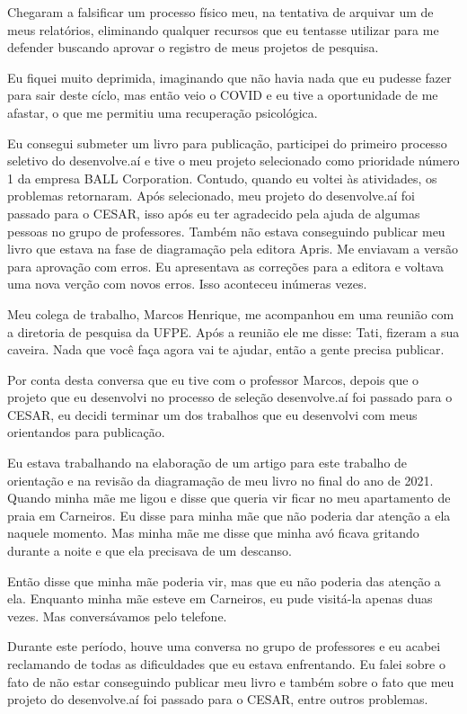 \documentclass[11pt]{book}
\begin{document}
Chegaram a falsificar um processo físico meu, na tentativa de arquivar um de meus relatórios, eliminando qualquer recursos que eu tentasse utilizar para me defender buscando aprovar o registro de meus projetos de pesquisa.

Eu fiquei muito deprimida, imaginando que não havia nada que eu pudesse fazer para sair deste cíclo, mas então veio o COVID e eu tive a oportunidade de me afastar, o que me permitiu uma recuperação psicológica. 

Eu consegui submeter um livro para publicação, participei do primeiro processo seletivo do desenvolve.aí e tive o meu projeto selecionado como prioridade número 1 da empresa BALL Corporation. Contudo, quando eu voltei às atividades, os problemas retornaram. Após selecionado, meu projeto do desenvolve.aí foi passado para o CESAR, isso após eu ter agradecido pela ajuda de algumas pessoas no grupo de professores. Também não estava conseguindo publicar meu livro que estava na fase de diagramação pela editora Apris. Me enviavam a versão para aprovação com erros. Eu apresentava as correções para a editora e voltava uma nova verção com novos erros. Isso aconteceu inúmeras vezes.

Meu colega de trabalho, Marcos Henrique, me acompanhou em uma reunião com a diretoria de pesquisa da UFPE. Após a reunião ele me disse: Tati, fizeram a sua caveira. Nada que você faça agora vai te ajudar, então a gente precisa publicar.

Por conta desta conversa que eu tive com o professor Marcos, depois que o projeto que eu desenvolvi no processo de seleção desenvolve.aí foi passado para o CESAR, eu decidi terminar um dos trabalhos que eu desenvolvi com meus orientandos para publicação.

Eu estava trabalhando na elaboração de um artigo para este trabalho de orientação e na revisão da diagramação de meu livro no final do ano de 2021. Quando minha mãe me ligou e disse que queria vir ficar no meu apartamento de praia em Carneiros. Eu disse para minha mãe que não poderia dar atenção a ela naquele momento. Mas minha mãe me disse que minha avó ficava gritando durante a noite e que ela precisava de um descanso.

Então disse que minha mãe poderia vir, mas que eu não poderia das atenção a ela. Enquanto minha mãe esteve em Carneiros, eu pude visitá-la apenas duas vezes. Mas conversávamos pelo telefone. 

Durante este período, houve uma conversa no grupo de professores e eu acabei reclamando de todas as dificuldades que eu estava enfrentando. Eu falei sobre o fato de não estar conseguindo publicar meu livro e também sobre o fato que meu projeto do desenvolve.aí foi passado para o CESAR, entre outros problemas.
\end{document}
